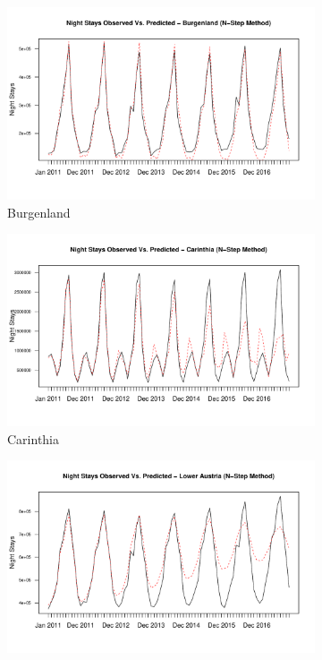 \documentclass[a4paper,reqno,]{article}
\begin{document}
\begin{figure}[H]
  \centering
  \begin{subfigure}[b]{0.32\linewidth}
    \includegraphics[width=\linewidth]{images/SVR/BurgenlandNstepSVR.pdf}
    \caption{Burgenland}
  \end{subfigure}
  \begin{subfigure}[b]{0.32\linewidth}
    \includegraphics[width=\linewidth]{images/SVR/CarinthiaNstepSVR.pdf}
    \caption{Carinthia}
  \end{subfigure}
  \begin{subfigure}[b]{0.32\linewidth}
    \includegraphics[width=\linewidth]{images/SVR/LowerAustriaNstepSVR.pdf}

\end{subfigure}
\end{figure}
\end{document}
